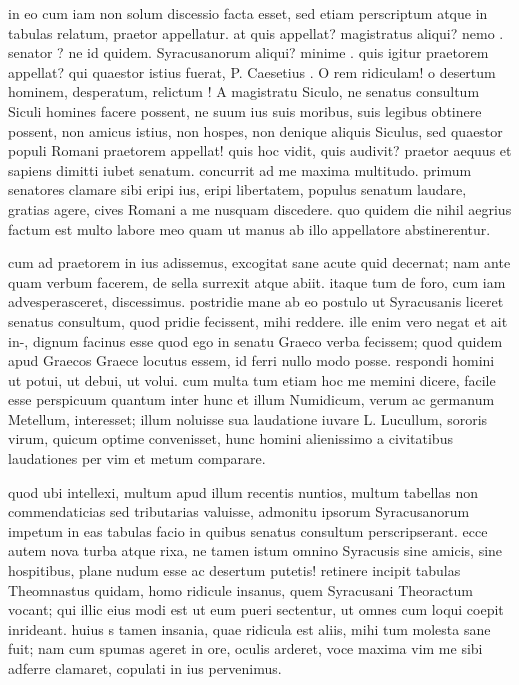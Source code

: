  in eo cum iam non solum discessio facta esset, sed etiam perscriptum atque in tabulas relatum, praetor appellatur. at quis appellat? magistratus aliqui? nemo . senator ? ne id quidem. Syracusanorum aliqui? minime . quis igitur praetorem appellat? qui quaestor istius fuerat, P. Caesetius . O rem ridiculam! o desertum hominem, desperatum, relictum ! A magistratu Siculo, ne senatus consultum Siculi homines facere possent, ne suum ius suis moribus, suis legibus obtinere possent, non amicus istius, non hospes, non denique aliquis Siculus, sed quaestor populi Romani praetorem appellat! quis hoc vidit, quis audivit? praetor aequus et sapiens dimitti iubet senatum. concurrit ad me maxima multitudo. primum senatores clamare sibi eripi ius, eripi libertatem, populus senatum laudare, gratias agere, cives Romani a me nusquam discedere. quo quidem die nihil aegrius factum est multo labore meo quam ut manus ab illo appellatore abstinerentur.

 cum ad praetorem in ius adissemus, excogitat sane acute quid decernat; nam ante quam verbum facerem, de sella surrexit atque abiit. itaque tum de foro, cum iam advesperasceret, discessimus. postridie mane ab eo postulo ut Syracusanis liceret senatus consultum, quod pridie fecissent, mihi reddere. ille enim vero negat et ait in-, dignum facinus esse quod ego in senatu Graeco verba fecissem; quod quidem apud Graecos Graece locutus essem, id ferri nullo modo posse. respondi homini ut potui, ut debui, ut volui. cum multa tum etiam hoc me memini dicere, facile esse perspicuum quantum inter hunc et illum Numidicum, verum ac germanum Metellum, interesset; illum noluisse sua laudatione iuvare L. Lucullum, sororis virum, quicum optime convenisset, hunc homini alienissimo a civitatibus laudationes per vim et metum comparare.

 quod ubi intellexi, multum apud illum recentis nuntios, multum tabellas non commendaticias sed tributarias valuisse, admonitu ipsorum Syracusanorum impetum in eas tabulas facio in quibus senatus consultum perscripserant. ecce autem nova turba atque rixa, ne tamen istum omnino Syracusis sine amicis, sine hospitibus, plane nudum esse ac desertum putetis! retinere incipit tabulas Theomnastus quidam, homo ridicule insanus, quem Syracusani Theoractum vocant; qui illic eius modi est ut eum pueri sectentur, ut omnes cum loqui coepit inrideant. huius s tamen insania, quae ridicula est aliis, mihi tum molesta sane fuit; nam cum spumas ageret in ore, oculis arderet, voce maxima vim me sibi adferre clamaret, copulati in ius pervenimus.

